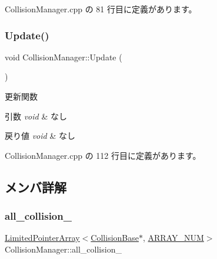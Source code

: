  Collision\+Manager.\+cpp の 81 行目に定義があります。

\mbox{\label{class_collision_manager_a23c21d077dbfd7ca86e7c0649d775dfc}} 
\subsubsection{\texorpdfstring{Update()}{Update()}}
{\footnotesize\ttfamily void Collision\+Manager\+::\+Update (\begin{DoxyParamCaption}{ }\end{DoxyParamCaption})}



更新関数 


\begin{DoxyParams}{引数}
{\em void} & なし \\
\hline
\end{DoxyParams}

\begin{DoxyRetVals}{戻り値}
{\em void} & なし \\
\hline
\end{DoxyRetVals}


 Collision\+Manager.\+cpp の 112 行目に定義があります。



\subsection{メンバ詳解}
\mbox{\label{class_collision_manager_a1be7aa8904688724543897d58b22a406}} 
\subsubsection{\texorpdfstring{all\+\_\+collision\+\_\+}{all\_collision\_}}
{\footnotesize\ttfamily \mbox{\hyperlink{class_limited_pointer_array}{Limited\+Pointer\+Array}}$<$\mbox{\hyperlink{class_collision_base}{Collision\+Base}}$\ast$, \mbox{\hyperlink{class_collision_manager_addbc64e1fa0b01f3be07c897887f44ec}{A\+R\+R\+A\+Y\+\_\+\+N\+UM}}$>$ Collision\+Manager\+::all\+\_\+collision\+\_\+\hspace{0.3cm}{\ttfamily [private]}}



